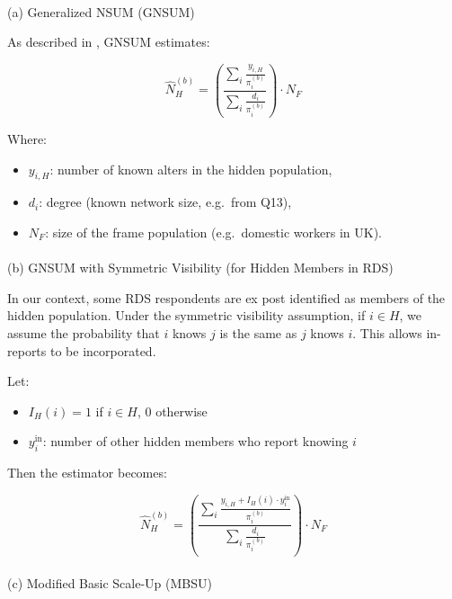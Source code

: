 \documentclass[
  12pt,
  letterpaper,
  DIV=11,
  numbers=noendperiod]{scrartcl}
\makeatletter
\let\oldparagraph\paragraph
\renewcommand{\paragraph}{
    \@ifstar
      \xxxParagraphStar
      \xxxParagraphNoStar
  }
\newcommand{\xxxParagraphStar}[1]{\oldparagraph*{#1}\mbox{}}
\newcommand{\xxxParagraphNoStar}[1]{\oldparagraph{#1}\mbox{}}
\theoremstyle{plain}
\theoremstyle{definition}
\makeatother
\begin{document}
\paragraph{(a) Generalized NSUM (GNSUM)}\label{a-generalized-nsum-gnsum}

As described in \textcite{feeh16-generaling}, GNSUM estimates:

\[\hat{N}_H^{(b)} = \left( \frac{\sum_{i} \frac{y_{i,H}}{\pi_i^{(b)}}}{\sum_{i} \frac{d_i}{\pi_i^{(b)}}} \right) \cdot N_F\]

Where:

\begin{itemize}
\item
  \(y_{i,H}\): number of known alters in the hidden population,
\item
  \(d_i\): degree (known network size, e.g.~from Q13),
\item
  \(N_F\): size of the frame population (e.g.~domestic workers in UK).
\end{itemize}

\paragraph{(b) GNSUM with Symmetric Visibility (for Hidden Members in
RDS)}\label{b-gnsum-with-symmetric-visibility-for-hidden-members-in-rds}

In our context, some RDS respondents are ex post identified as members
of the hidden population. Under the symmetric visibility assumption, if
\(i \in H\), we assume the probability that \(i\) knows \(j\) is the
same as \(j\) knows \(i\). This allows in-reports to be incorporated.

Let:

\begin{itemize}
\item
  \(I_H(i) = 1\) if \(i \in H\), 0 otherwise
\item
  \(y_{i}^{\text{in}}\): number of other hidden members who report
  knowing \(i\)
\end{itemize}

Then the estimator becomes:

\[\hat{N}_H^{(b)} = \left( \frac{\sum_{i} \frac{y_{i,H} + I_H(i) \cdot y_{i}^{\text{in}}}{\pi_i^{(b)}}}{\sum_{i} \frac{d_i}{\pi_i^{(b)}}} \right) \cdot N_F\]

\paragraph{(c) Modified Basic Scale-Up
(MBSU)}\label{c-modified-basic-scale-up-mbsu}
\end{document}
